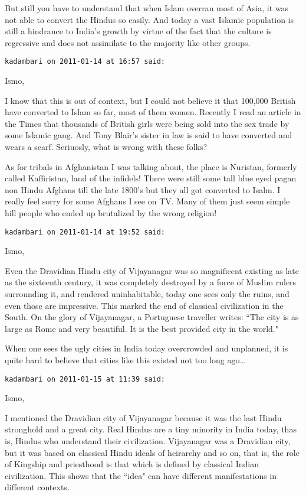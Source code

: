\begin{footnotesize}
\begin{sffamily}
But still you have to understand that when Islam overran most of Asia, it was not able to convert the Hindus so easily. And today a vast Islamic population is still a hindrance to India's growth by virtue of the fact that the culture is regressive and does not assimilate to the majority like other groups.


\hfill

\texttt{kadambari on 2011-01-14 at 16:57 said: }

Ismo,

I know that this is out of context, but I could not believe it that 100,000 British have converted to Islam so far, most of them women. Recently I read an article in the Times that thousands of British girls were being sold into the sex trade by some Islamic gang. And Tony Blair's sister in law is said to have converted and wears a scarf. Seriuosly, what is wrong with these folks?

As for tribals in Afghanistan I was talking about, the place is Nuristan, formerly called Kaffiristan, land of the infidels! There were still some tall blue eyed pagan non Hindu Afghans till the late 1800's but they all got converted to Isalm. I really feel sorry for some Afghans I see on TV. Many of them just seem simple hill people who ended up brutalized by the wrong religion!


\hfill

\texttt{kadambari on 2011-01-14 at 19:52 said: }

Ismo,

Even the Dravidian Hindu city of Vijayanagar was so magnificent existing as late as the sixteenth century, it was completely destroyed by a force of Muslim rulers surrounding it, and rendered uninhabitable, today one sees only the ruins, and even those are impressive. This marked the end of classical civilization in the South. On the glory of Vijayanagar, a Portuguese traveller writes: ``The city is as large as Rome and very beautiful. It is the best provided city in the world."

When one sees the ugly cities in India today overcrowded and unplanned, it is quite hard to believe that cities like this existed not too long ago…


\hfill

\texttt{kadambari on 2011-01-15 at 11:39 said: }

Ismo,

I mentioned the Dravidian city of Vijayanagar because it was the last Hindu stronghold and a great city. Real Hindus are a tiny minority in India today, thas is, Hindus who understand their civilization. Vijayanagar was a Dravidian city, but it was based on classical Hindu ideals of heirarchy and so on, that is, the role of Kingship and priesthood is that which is defined by classical Indian civilization. This shows that the ``idea" can have different manifestations in different contexts.


\end{sffamily}
\end{footnotesize}
